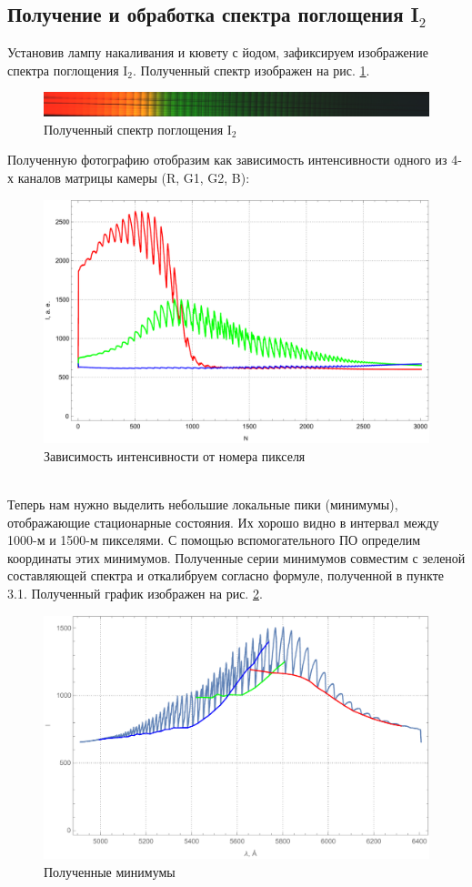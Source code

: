 \documentclass[a4paper, 12pt]{article}
\begin{document}
\subsection{Получение и обработка спектра поглощения I$_2$}
Установив лампу накаливания и кювету с йодом, зафиксируем изображение спектра поглощения I$_2$. Полученный спектр изображен на рис. \ref{i2_spec}.
\begin{figure}[!htb]
	\centering
	\includegraphics[width=\textwidth]{i2.jpeg}
	\caption{Полученный спектр поглощения I$_2$}
	\label{i2_spec}
\end{figure}
Полученную фотографию отобразим как зависимость интенсивности одного из 4-х каналов матрицы камеры (R, G1, G2, B):
\begin{figure}[!htb]
	\centering
	\includegraphics[scale=0.6]{plot3.pdf}
	\caption{Зависимость интенсивности от номера пикселя}
\end{figure}\\
Теперь нам нужно выделить небольшие локальные пики (минимумы), отображающие стационарные состояния. Их хорошо видно в интервал между 1000-м и 1500-м пикселями. С помощью вспомогательного ПО определим координаты этих минимумов. Полученные серии минимумов совместим с зеленой составляющей спектра и откалибруем согласно формуле, полученной в пункте 3.1. Полученный график изображен на рис. \ref{mins}.
\begin{figure}[!htb]
\centering
\includegraphics[scale=0.7]{plot4.pdf}
\caption{Полученные минимумы}
\label{mins}
\end{figure}\\
\end{document}
